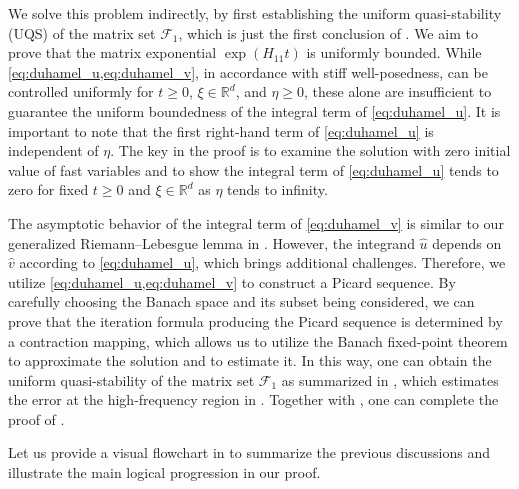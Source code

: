 \documentclass{article}
\theoremstyle{plain}%
\theoremstyle{definition}%
\theoremstyle{remark}%
\newcommand{\bR}{\mathbb{R}}
\newcommand{\cF}{\mathcal{F}}
\newcommand{\+}[1]{{\bm{#1}}}
\begin{document}
We solve this problem indirectly, by first establishing the 
uniform quasi-stability (UQS) of the matrix set $\cF_1$, which is 
just the first conclusion of .
We aim to prove that the matrix exponential $\exp(H_{11} t)$ is 
uniformly bounded.
While \cref{eq:duhamel_u,eq:duhamel_v}, in accordance with stiff 
well-posedness, can be controlled uniformly for $t \ge 0$, 
$\xi \in \bR^d$, and $\eta \ge 0$, these alone are insufficient to 
guarantee the uniform boundedness of the integral term of 
\cref{eq:duhamel_u}.
It is important to note that the first right-hand term of 
\cref{eq:duhamel_u} is independent of $\eta$. 
The key in the proof is to examine the solution with zero initial 
value of fast variables and to show the integral term of 
\cref{eq:duhamel_u} tends to zero for fixed $t \ge 0$ and 
$\xi \in \bR^d$ as $\eta$ tends to infinity.

The asymptotic behavior of the integral term of \cref{eq:duhamel_v} 
is similar to our generalized Riemann--Lebesgue lemma in 
. 
However, the integrand $\hat{u}$ depends on $\hat{v}$ according to 
\cref{eq:duhamel_u}, which brings additional challenges. 
Therefore, we utilize \cref{eq:duhamel_u,eq:duhamel_v} to construct 
a Picard sequence. By carefully choosing the Banach space and its 
subset being considered, we can prove that the iteration formula
producing the Picard sequence is determined by a contraction mapping,
which allows us to utilize the Banach fixed-point theorem to 
approximate the solution and to estimate it. 
In this way, one can obtain the uniform quasi-stability of the matrix 
set $\cF_1$ as summarized in , which estimates 
the error at the high-frequency region in 
. 
Together with , one can complete the proof 
of .

Let us provide a visual flowchart in  to summarize the 
previous discussions and illustrate the main logical progression 
in our proof.
\end{document}
